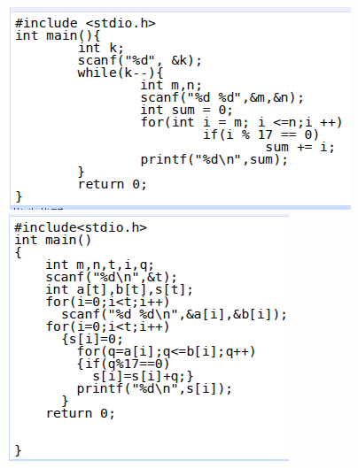 \documentclass[color=usenames,dvipsnames]{beamer}
\begin{document}
{\begin{columns}
     \column{0.5\hsize}
    \includegraphics[width=0.9\hsize]{pic/满足条件的数累加-good.png} \\
    \vspace{0.1cm}
    \includegraphics[width=0.8\hsize]{pic/满足条件的数累加-bad.png}
    \end{columns}
}
\end{document}

